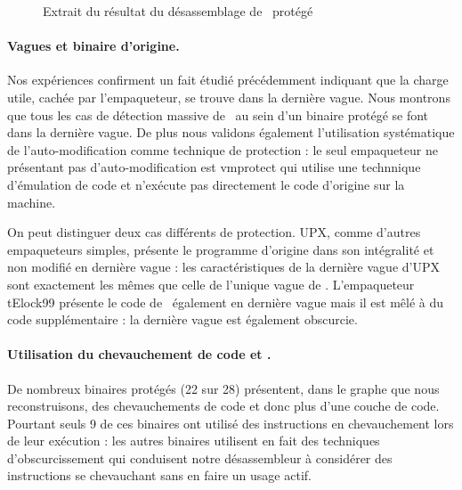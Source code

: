 \begin{figure}[h]
\begin{small}
 
\end{small}
\caption{Extrait du résultat du désassemblage de \hostname\ protégé}
\label{fig:packers_extrait}
\end{figure}

\paragraph{Vagues et binaire d'origine.}
Nos expériences confirment un fait étudié précédemment \cite{Calvet2013,renovo,polyunpack} indiquant que la charge utile, cachée par l'empaqueteur, se trouve dans la dernière vague.
Nous montrons que tous les cas de détection massive de \hostname\ au sein d'un binaire protégé se font dans la dernière vague.
De plus nous validons également l'utilisation systématique de l'auto-modification comme technique de protection : le seul empaqueteur ne présentant pas d'auto-modification est vmprotect qui utilise une technnique d'émulation de code et n'exécute pas directement le code d'origine sur la machine.

On peut distinguer deux cas différents de protection. UPX, comme d'autres empaqueteurs simples, présente le programme d'origine dans son intégralité et non modifié en dernière vague : les caractéristiques de la dernière vague d'UPX sont exactement les mêmes que celle de l'unique vague de \hostname. L'empaqueteur tElock99 présente le code de \hostname\ également en dernière vague mais il est mêlé à du code supplémentaire : la dernière vague est également obscurcie.

\paragraph{Utilisation du chevauchement de code et \layers.}
De nombreux binaires protégés (22 sur 28) présentent, dans le graphe que nous reconstruisons, des chevauchements de code et donc plus d'une couche de code. Pourtant seuls 9 de ces binaires ont utilisé des instructions en chevauchement lors de leur exécution : les autres binaires utilisent en fait des techniques d'obscurcissement qui conduisent notre désassembleur à considérer des instructions se chevauchant sans en faire un usage actif. 

